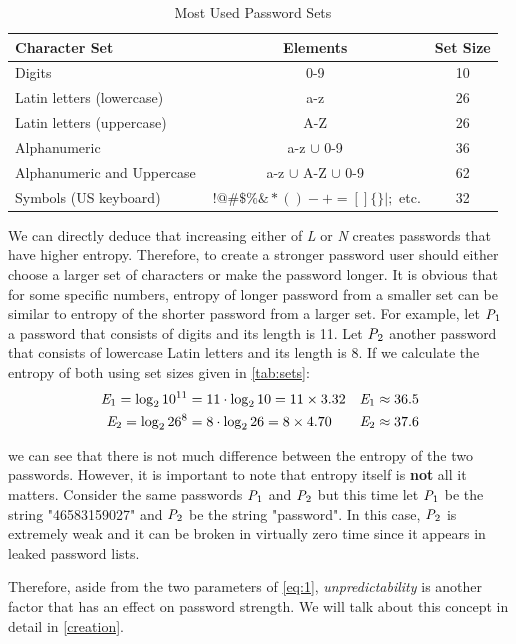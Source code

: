 \documentclass[acmsmall,nonacm]{acmart}
\begin{document}
\begin{table}[ht!]
 \begin{tabular}[c]{| l  c  c |} 
\hline 
 Character Set & Elements & Set Size \\
 \hline\hline
 Digits & 0-9 & 10  \\ 
 \hline
 Latin letters (lowercase) & a-z & 26 \\
 \hline
 Latin letters (uppercase) & A-Z & 26  \\
 \hline
 Alphanumeric & a-z $\cup$  0-9 & 36  \\
 \hline
 Alphanumeric and Uppercase & a-z $\cup$ A-Z $\cup$ 0-9 & 62 \\  
 \hline
 Symbols (US keyboard) & $~!@\#\$\%\&*()-+=[]\{\}|;$ etc. & 32  \\
 \hline
 \end{tabular}
 \caption{Most Used Password Sets}
 \label{tab:sets}
\end{table}

We can directly deduce that increasing either of \emph{L} or \emph{N} creates passwords that have higher entropy. Therefore, to create a stronger password user should either choose a larger set of characters or make the password longer. It is obvious that for some specific numbers, entropy of longer password from a smaller set can be similar to entropy of the shorter password from a larger set. For example, let $\emph{P}_1$ a password that consists of digits and its length is 11. Let $\emph{P}_2$ another password that consists of lowercase Latin letters and its length is 8. If we calculate the entropy of both using set sizes given in \autoref{tab:sets}:
\begin{align*}\label{eq:p1p2calc}
    \emph{E}_1 = \log_2 10^{11} &= 11 \cdot \log_2 10 = 11 \times 3.32 &\emph{E}_1 \approx 36.5 \\
    \emph{E}_2 = \log_2 26^8  &= 8  \cdot \log_2 26   = 8 \times 4.70 &\emph{E}_2 \approx 37.6
\end{align*}

\noindent we can see that there is not much difference between the entropy of the two passwords. However, it is important to note that entropy itself is \textbf{not} all it matters. Consider the same passwords $\emph{P}_1$ and $\emph{P}_2$ but this time let $\emph{P}_1$ be the string "46583159027" and $\emph{P}_2$ be the string "password". In this case, $\emph{P}_2$ is extremely weak and it can be broken in virtually zero time since it appears in leaked password lists.

Therefore, aside from the two parameters of \autoref{eq:1}, \emph{unpredictability}  is another factor that has an effect on password strength. We will talk about this concept in detail in \autoref{creation}.
\end{document}
